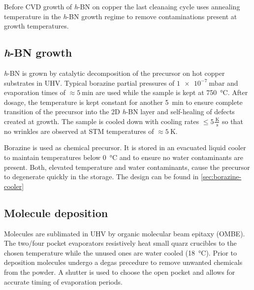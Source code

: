 Before CVD growth of \textit{h}-BN on copper the last cleanaing cycle uses annealing temperature in the \textit{h}-BN growth regime to remove contaminations present at growth temperatures.

\subsection{\textit{h}-BN growth}
\label{sec:h-BN-growth}
\textit{h}-BN is grown by catalytic decomposition of the  precursor on hot copper substrates in UHV. Typical borazine partial pressures of $\SI{1e-7}{\milli \bar}$ and evaporation times of $\approx \SI{5}{\minute}$ are used while the sample is kept at \SI{750}{\celsius}. After dosage, the temperature is kept constant for another \SI{5}{\minute} to ensure complete transition of the precursor into the 2D \textit{h}-BN layer and self-healing of defects created at growth. The sample is cooled down with cooling rates $\leq 5 \frac{\SI{}{\kelvin}}{\SI{}{\second}}$ so that no wrinkles are observed at STM temperatures of $\approx \SI{5}{\kelvin}$.

Borazine is used as chemical precursor. It is stored in an evacuated liquid cooler to maintain temperatures below \SI{0}{\celsius} and to ensure no water contaminants are present. Both, elevated temperature and water contaminants, cause the precursor to degenerate quickly in the storage. The design can be found in \autoref{sec:borazine-cooler}

\subsection{Molecule deposition}
\label{sec:molecule-deposition}
Molecules are sublimated in UHV by organic molecular beam epitaxy (OMBE). The two/four pocket evaporators resistively heat small quarz crucibles to the chosen temperature while the unused ones are water cooled (\SI{18}{\celsius}). Prior to deposition molecules undergo a degas precedure to remove unwanted chemicals from the powder. A shutter is used to choose the open pocket and allows for accurate timing of evaporation periods.

